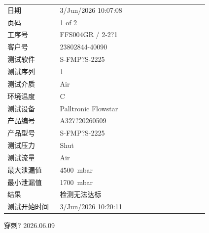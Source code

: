 \documentclass[UTF8,10pt,a4paper,fontset=fandol]{ctexart}
\newcommand{\fieldvalue}[1]{#1}
\newcommand{\handwritten}[1]{#1}
\begin{document}
\begin{tabular}{@{}p{0.24\linewidth}p{0.68\linewidth}@{}}
日期 &
\fieldvalue{3/Jun/2026 10:07:08}
\\[2pt]
页码 &
\fieldvalue{1 of 2}
\\[2pt]
工序号 &
\fieldvalue{FFS004GR / 2-2?1}
\\[2pt]
客户号 &
\fieldvalue{23802844-40090}
\\[2pt]
测试软件 &
\fieldvalue{S-FMP?S-2225}
\\[2pt]
测试序列 &
\fieldvalue{1}
\\[2pt]
测试介质 &
\fieldvalue{Air}
\\[2pt]
环境温度 &
\fieldvalue{C}
\\[2pt]
测试设备 &
\fieldvalue{Palltronic Flowstar}
\\[2pt]
产品编号 &
\fieldvalue{A327?20260509}
\\[2pt]
产品型号 &
\fieldvalue{S-FMP?S-2225}
\\[2pt]
测试压力 &
\fieldvalue{Shut}
\\[2pt]
测试流量 &
\fieldvalue{Air}
\\[2pt]
最大泄漏值 &
\fieldvalue{4500\ mbar}
\\[2pt]
最小泄漏值 &
\fieldvalue{1700\ mbar}
\\[2pt]
结果 &
\fieldvalue{检测无法达标}
\\[2pt]
测试开始时间 &
\fieldvalue{3/Jun/2026 10:20:11}
\end{tabular}

\vspace{1em}

\handwritten{穿刺? 2026.06.09}
\end{document}
